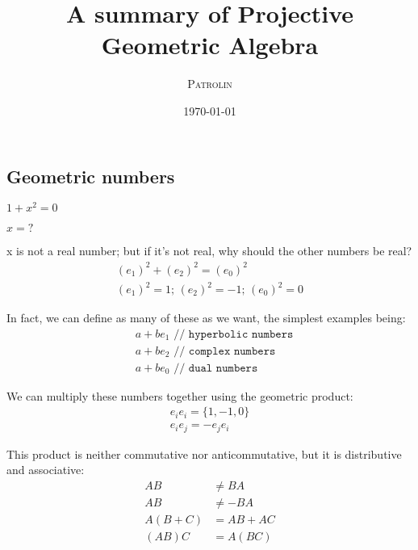 \documentclass[twoside]{article}
\title{A summary of Projective Geometric Algebra}
\author{\textsc{Patrolin}}
\date{\today}
\newcommand{\T}[1]{\textrm{#1}} %
\newcommand{\B}[1]{\left(#1\right)} %
\begin{document}
    \maketitle
    \thispagestyle{empty}

    \begin{multicols*}{2}
        \section{Geometric numbers}
            \centerline{$ 1 + x^2 = 0 $}
            \centerline{$ x = \T{?} $}\vspace{5px}
            \par
                x is not a real number; but if it's not real, why should the other numbers be real?
                \begin{gather*}
                    \B{e_1}^2 + \B{e_2}^2 = \B{e_0}^2 \\
                    \B{e_1}^2 = 1;\, \B{e_2}^2 = -1;\, \B{e_0}^2 = 0
                \end{gather*}
            \par
                In fact, we can define as many of these as we want, the simplest examples being:
                $$\begin{aligned}
                    &a + b e_1 \texttt{ // hyperbolic numbers} \\
                    &a + b e_2 \texttt{ // complex numbers} \\
                    &a + b e_0 \texttt{ // dual numbers}
                \end{aligned}$$
            \par
                We can multiply these numbers together using the geometric product:
                \begin{gather*}
                    e_i e_i = \{1, -1, 0\} \\
                    e_i e_j = -e_j e_i
                \end{gather*}
            \par
                This product is neither commutative nor anticommutative, but it is distributive and associative:
                $$\begin{aligned}
                    AB &\neq BA \\
                    AB &\neq -BA \\
                    A(B+C) &= AB + AC \\
                    (AB)C &= A(BC) \\

\end{aligned}$$
\end{multicols*}
\end{document}

